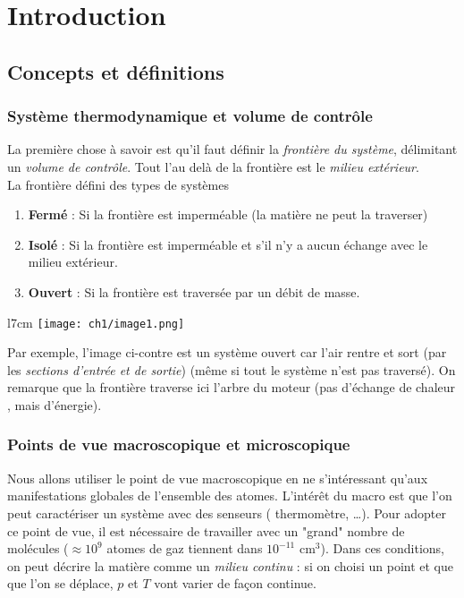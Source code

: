 \chapter{Introduction} 

\setcounter{section}{1}
\section{Concepts et définitions}
\subsection{Système thermodynamique et volume de contrôle}
La première chose à savoir est qu'il faut définir la \textit{frontière 
	du système}, délimitant un \textit{volume de contrôle}. Tout l'au delà 
de la frontière est le \textit{milieu extérieur}.\\
	
La frontière défini des types de systèmes
\begin{enumerate}
	\item \textbf{Fermé} : Si la frontière est imperméable (la matière ne 
	      peut la traverser)
	\item \textbf{Isolé} : Si la frontière est imperméable et s'il n'y a 
	      aucun échange avec le milieu extérieur.
	\item \textbf{Ouvert} : Si la frontière est traversée par un débit de 
	      masse.
\end{enumerate}
	
\begin{wrapfigure}[6]{l}{7cm}
	\vspace{-6mm}
	\texttt{[image: ch1/image1.png]}
\end{wrapfigure}
Par exemple, l'image ci-contre est un système ouvert car l'air 
rentre et sort (par les \textit{sections d'entrée et de sortie}) (même 
si tout le système n'est pas traversé). On remarque que la frontière 
traverse ici l'arbre du moteur (pas d'échange de chaleur , mais 
d'énergie).
	
	
\subsection{Points de vue macroscopique et microscopique}
Nous allons utiliser le point de vue macroscopique en ne s'intéressant  
qu'aux manifestations globales de l'ensemble des atomes. L'intérêt du 
macro est que l'on peut caractériser un système avec des senseurs (
thermomètre, \dots). Pour adopter ce point de vue, il est nécessaire 
de travailler avec un "grand" nombre de molécules ($\approx 10^9$ atomes 
de gaz tiennent dans $10^{-11}$ cm$^3$). Dans ces conditions, on peut 
décrire la matière comme un \textit{milieu continu} : si on choisi un 
point et que que l'on se déplace, $p$ et $T$ vont varier de façon 
continue.
	

